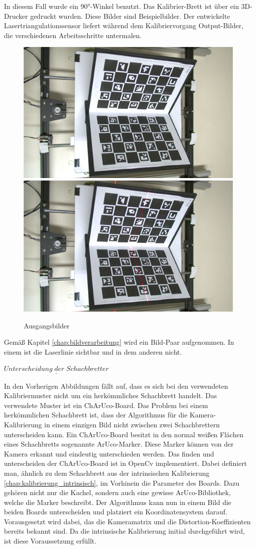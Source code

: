 		In diesem Fall wurde ein 90°-Winkel benutzt. Das Kalibrier-Brett ist über ein 3D-Drucker gedruckt wurden. Diese Bilder sind Beispielbilder. Der entwickelte Lasertriangulationssensor liefert während dem Kalibriervorgang Output-Bilder, die verschiedenen Arbeitsschritte untermalen. 
		
		\begin{figure}[h]
			\centering
			\includegraphics[width=0.49\linewidth]{img/hauptteil/ext-calib/charuco_board.png}
			\includegraphics[width=0.49\linewidth]{img/hauptteil/ext-calib/charuco_board_laser.png}
			\caption{Ausgangsbilder}
			\label{fig:ext-calib-raw}
		\end{figure} 
	
		Gemäß Kapitel \ref{chap:bildverarbeitung} wird ein Bild-Paar aufgenommen. In einem ist die Laserlinie sichtbar und in dem anderen nicht.
		
		$\underline{Unterscheidung \; der \; Schachbretter}$
		
		In den Vorherigen Abbildungen fällt auf, dass es sich bei den verwendeten Kalibriermuster nicht um ein herkömmliches Schachbrett handelt. Das verwendete Muster ist ein ChArUco-Board. Das Problem bei einem herkömmlichen Schachbrett ist, dass der Algorithmus für die Kamera-Kalibrierung in einem einzigen Bild nicht zwischen zwei Schachbrettern unterscheiden kann. Ein ChArUco-Board besitzt in den normal weißen Flächen eines Schachbretts sogenannte ArUco-Marker. Diese Marker können von der Kamera erkannt und eindeutig unterschieden werden. Das finden und unterscheiden der ChArUco-Board ist in OpenCv implementiert. Dabei definiert man, ähnlich zu dem Schachbrett aus der intrinsischen Kalibrierung \ref{chap:kalibrierung_intrinsisch}, im Vorhinein die Parameter des Boards. Dazu gehören nicht nur die Kachel, sondern auch eine gewisse ArUco-Bibliothek, welche die Marker beschreibt. Der Algorithmus kann nun in einem Bild die beiden Boards unterscheiden und platziert ein Koordinatensystem darauf. Vorausgesetzt wird dabei, das die Kameramatrix und die Distortion-Koeffizienten bereits bekannt sind. Da die intrinsische Kalibrierung initial durchgeführt wird, ist diese Voraussetzung erfüllt.  
		
